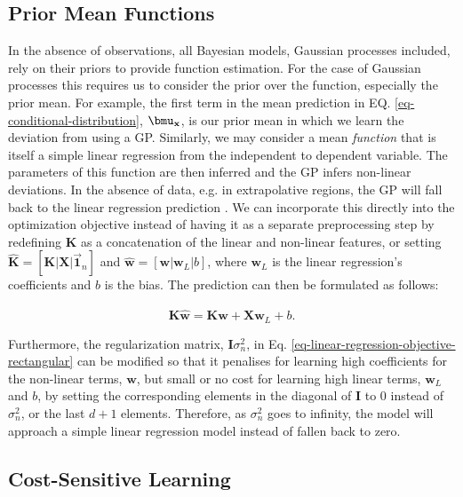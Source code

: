 \documentclass[useAMS,usenatbib,fleqn]{mn2e}
\begin{document}
\subsection{Prior Mean Functions}

In the absence of observations, all Bayesian models, Gaussian processes included, rely on their priors to provide function estimation. For the case of Gaussian processes this requires us to consider the prior over the function, especially the prior mean. For example, the first term in the mean prediction in EQ. \eqref{eq-conditional-distribution}, $\bmu_{\mathbf{x}}$, is our prior mean in which we learn the deviation from using a GP. Similarly, we may consider a mean \emph{function} that is itself a simple linear regression from the independent to dependent variable. The parameters of this function are then inferred and the GP infers non-linear deviations. In the absence of data, e.g. in extrapolative regions, the GP will fall back to the linear regression prediction \citep{roberts2012rs}. We can incorporate this directly into the optimization objective instead of having it as a separate preprocessing step by redefining $\mathbf{K}$ as a concatenation of the linear and non-linear features, or setting $\mathbf{\hat K}=[\mathbf{K}|\mathbf{X}|\vec{\mathbf{1}}_{n}]$ and $\mathbf{\hat w} = \left [\mathbf{w}|\mathbf{w}_{L}|b \right]$, where $\mathbf{w}_{L}$ is the linear regression's coefficients and $b$ is the bias. The prediction can then be formulated as follows:

\begin{equation}
\label{eq-joint-concatenation}
\mathbf{\hat K}\mathbf{\hat w} = \mathbf{K}\mathbf{w}+\mathbf{X}\mathbf{w}_{L}+b.
\end{equation}

Furthermore, the regularization matrix, $\mathbf{I}\sigma_{n}^{2}$, in Eq. \eqref{eq-linear-regression-objective-rectangular} can be modified so that it penalises for learning high coefficients for the non-linear terms, $\mathbf{w}$, but small or no cost for learning high linear terms, $\mathbf{w}_{L}$ and $b$, by setting the corresponding elements in the diagonal of $\mathbf{I}$ to 0 instead of $\sigma_{n}^{2}$, or the last $d+1$ elements. Therefore, as $\sigma_{n}^{2}$ goes to infinity, the model will approach a simple linear regression model instead of fallen back to zero.

\subsection{Cost-Sensitive Learning}
\end{document}
